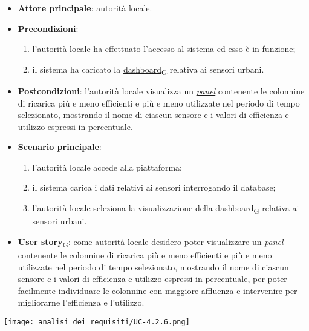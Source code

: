 \newpage
{}
\begin{itemize}
	\item \textbf{Attore principale}: autorità locale.
	\item \textbf{Precondizioni}:
	      \begin{enumerate}
		      \item l'autorità locale ha effettuato l'accesso al sistema ed esso è in funzione;
		      \item il sistema ha caricato la \href{https://7last.github.io/docs/pb/documentazione-interna/glossario\#dashboard}{dashboard\textsubscript{G}} relativa ai sensori urbani.
	      \end{enumerate}
	\item \textbf{Postcondizioni}: l'autorità locale visualizza un \href{https://7last.github.io/docs/pb/documentazione-interna/glossario\#panel}{\textit{panel}} contenente le colonnine di ricarica più e meno efficienti e più e meno utilizzate nel periodo di tempo selezionato, mostrando il nome di ciascun sensore e i valori di efficienza e utilizzo espressi in percentuale.
	\item \textbf{Scenario principale}:
	      \begin{enumerate}
		      \item l'autorità locale accede alla piattaforma;
		      \item il sistema carica i dati relativi ai sensori interrogando il database;
		      \item l'autorità locale seleziona la visualizzazione della \href{https://7last.github.io/docs/pb/documentazione-interna/glossario\#dashboard}{dashboard\textsubscript{G}} relativa ai sensori urbani.
	      \end{enumerate}
	\item \href{https://7last.github.io/docs/pb/documentazione-interna/glossario\#user-story}{\textbf{User story}\textsubscript{G}}:
	      come autorità locale desidero poter visualizzare un \href{https://7last.github.io/docs/pb/documentazione-interna/glossario\#panel}{\textit{panel}} contenente le colonnine di ricarica più e meno efficienti e più e meno utilizzate nel periodo di tempo selezionato, mostrando il nome di ciascun sensore e i valori di efficienza e utilizzo espressi in percentuale, per poter facilmente individuare le colonnine con maggiore affluenza e intervenire per migliorarne l'efficienza e l'utilizzo.
\end{itemize}
\begin{center}
	\texttt{[image: analisi\_dei\_requisiti/UC-4.2.6.png]}
\end{center}

